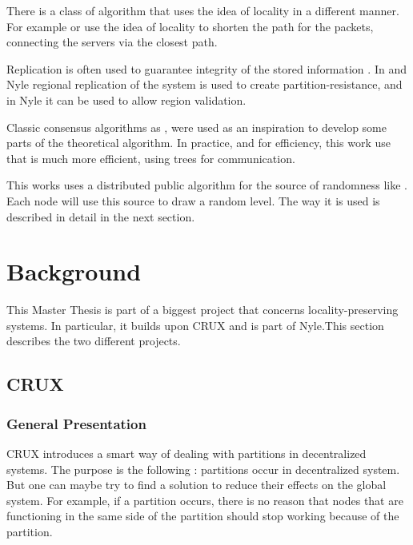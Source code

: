 \documentclass[a4paper,11pt,oneside]{report}
\begin{document}
There is a class of algorithm that uses the idea of locality in a different
manner. For example \cite{Geo-DNS} or \cite{IP Anycast} use the idea of
locality to shorten the path for the packets, connecting the servers via the
closest path.

Replication is often used to guarantee integrity of the stored information
\cite{find-paper-replication}. In \cite{CRUX} and Nyle regional replication of
the system is used to create partition-resistance, and in Nyle it can be used
to allow region validation.

Classic consensus algorithms as \cite{Paxos}, \cite{PBFT} were used as an
inspiration to develop some parts of the theoretical algorithm. In practice,
and for efficiency, this work use \cite{BlsCoSi} that is much more efficient,
using trees for communication.  

This works uses a distributed public algorithm for the source of randomness
like \cite{RandHound}. Each node will use this source to draw a random level.
The way it is used is described in detail in the next section. 



\chapter{Background}


This Master Thesis is part of a biggest project that concerns
locality-preserving systems. In particular, it builds upon
CRUX\cite{basescu2014crux} and is part of Nyle.This section describes the two
different projects. 

\section{CRUX}

\subsection{General Presentation} CRUX introduces a smart way of dealing with
partitions in decentralized systems. The purpose is the following : partitions
occur in decentralized system. But one can maybe try to find a solution to
reduce their effects on the global system. For example, if a partition occurs,
there is no reason that nodes that are functioning in the same side of the
partition should stop working because of the partition. 
\end{document}
